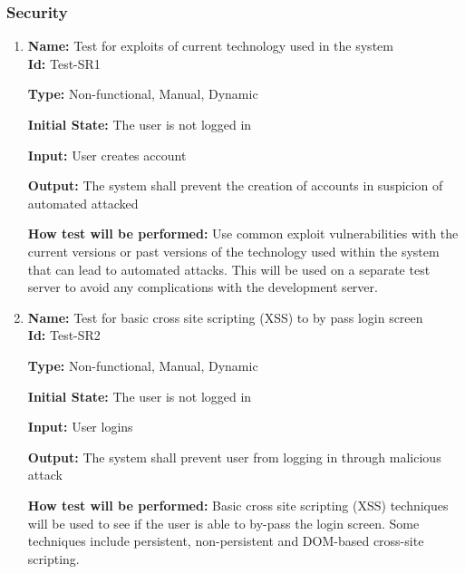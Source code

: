 \documentclass[12pt, titlepage]{article}
\begin{document}
\subsubsection{Security}
\begin{enumerate}
    \item{\textbf{Name:} Test for exploits of current technology used in the system\\} \label{Test-SR1}
   \textbf{ Id: }Test-SR1
   
    \textbf{Type:} Non-functional, Manual, Dynamic
    					
    \textbf{Initial State:} The user is not logged in
    					
    \textbf{Input:} User creates account
    					
    \textbf{Output:} The system shall prevent the creation of accounts in suspicion of automated attacked
    					
    \textbf{How test will be performed:} Use common exploit vulnerabilities with the current versions or past versions of the technology used within the system that can lead to automated attacks. This will be used on a separate test server to avoid any complications with the development server.
    
    \item{\textbf{Name:} Test for basic cross site scripting (XSS) to by pass login screen\\} \label{Test-SR2}
    \textbf{Id:} Test-SR2
    
    \textbf{Type:} Non-functional, Manual, Dynamic
    					
    \textbf{Initial State:} The user is not logged in
    					
    \textbf{Input:} User logins
    					
    \textbf{Output:} The system shall prevent user from logging in through malicious attack
    					
    \textbf{How test will be performed:} Basic cross site scripting (XSS) techniques will be used to see if the user is able to by-pass the login screen. Some techniques include persistent, non-persistent and DOM-based cross-site scripting.
    
    
    					
    					

\end{enumerate}
\end{document}
